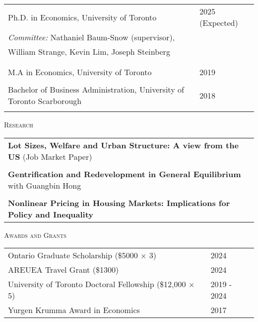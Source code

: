 \documentclass[11pt]{amsart}
\begin{document}
\normalsize
\begin{tabular}{ p{12.5cm}  p{5cm}}
  \large{Ph.D. in Economics, University of Toronto}  & 2025 (Expected) \\
   \multicolumn{2}{l}{ \hspace{.75cm}  \emph{Committee:}  Nathaniel Baum-Snow (supervisor), } \\
     \hspace{2.8cm}  William Strange, Kevin Lim, Joseph Steinberg  \\
 \hspace{2.90cm}   \\
  \\
  \large{M.A in Economics, University of Toronto}    & 2019            \\
   \\
  \large{Bachelor of Business Administration, University of Toronto Scarborough}   & 2018            \\
                                                     &                 
\end{tabular}

\vspace{0.4cm}




\LARGE
\textsc{Research}
\vspace{0.2cm}
\normalsize

\begin{tabular}{ p{15.5cm}}
 \textbf{Lot Sizes, Welfare and Urban Structure: A view from the US} (Job Market Paper)                         \\

\\
 \textbf{Gentrification and Redevelopment in General Equilibrium}  with Guangbin Hong \\
\\
\textbf{Nonlinear Pricing in Housing Markets: Implications for Policy and Inequality} 
\normalsize
\end{tabular}

\vspace{0.4cm}

\LARGE
\textsc{Awards and Grants}
\vspace{0.2cm}


\normalsize 
\begin{tabular}{ p{12.5cm}  p{5cm}}
  Ontario Graduate Scholarship (\$5000 $\times$ 3) & 2024 \\
  AREUEA Travel Grant (\$1300)    & 2024         \\
  University of Toronto Doctoral Fellowship  (\$12,000 $ \times$ 5)  & 2019 - 2024  \\
  Yurgen Krumma Award in Economics & 2017
\end{tabular}
\end{document}
